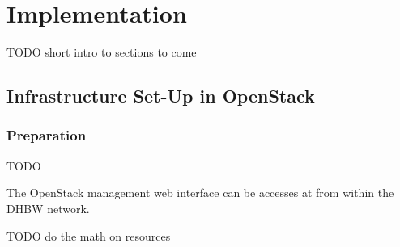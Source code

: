 \chapter{Implementation}
\label{chap:impl}

TODO short intro to sections to come

\section{Infrastructure Set-Up in OpenStack}

\subsection{Preparation}

TODO

    The OpenStack management web interface can be accesses at  from within the \ac{DHBW} network. 


TODO do the math on resources

\begin{table}[hbt]
	\caption{Available resources for the project in the \ac{DHBW} OpenStack environment}
	\label{fig:resources_openstack}
\end{table}

\begin{table}[hbt]
	\caption{Available instance sizes in the \ac{DHBW} OpenStack environment}
	\label{fig:instance_sizes}
\end{table}


